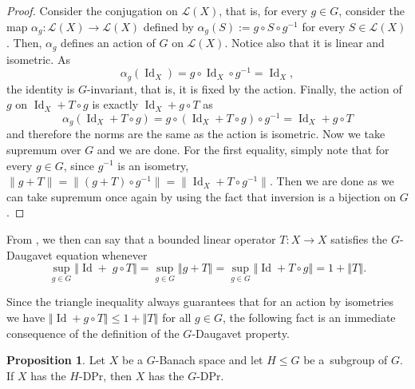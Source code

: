 \documentclass[a4paper,12pt]{amsart}
\theoremstyle{definition}
\newtheorem{proposition}[theorem]{Proposition}
\theoremstyle{definition}
\theoremstyle{remark}
\numberwithin{equation}{section}
\DeclareMathOperator{\id}{Id}
\renewcommand{\leq}{\leqslant}
\newcommand{\<}{\langle}
\renewcommand{\>}{\rangle}
\newcommand{\norm}[1]{\left\Vert#1\right\Vert}
\begin{document}
	\begin{proof} Consider the conjugation on $\mathcal{L}(X)$, that is, for every $g \in G$, consider the map $\alpha_g: \mathcal{L}(X) \rightarrow \mathcal{L}(X)$ defined by $\alpha_g(S) := g \circ S \circ g^{-1}$ for every $S \in \mathcal{L}(X)$. Then, $\alpha_g$ defines an action of $G$ on $\mathcal{L}(X)$. Notice also that it is linear and isometric. As
		\begin{equation*}
			\alpha_g(\id_X) = g \circ \id_X \circ g^{-1} = \id_X, 
		\end{equation*}
		the identity is $G$-invariant, that is, it is fixed by the action. Finally, the action of $g$ on $\id_X + T \circ g$ is exactly $\id_X + g \circ T$ as 
		\begin{equation*}
			\alpha_g(\id_X + T \circ g) = g \circ (\id_X + T \circ g) \circ g^{-1} = \id_X + g \circ T
		\end{equation*}
		and therefore the norms are the same as the action is isometric. Now we take supremum over $G$ and we are done. For the first equality, simply note that for every $g\in G$, since $g^{-1}$ is an isometry, $\|g+T\|=\|(g+T)\circ g^{-1}\|=\|\id_X+T\circ g^{-1}\|$. Then  we are done as we can take supremum once again by using the fact that inversion is a bijection on $G$.
	\end{proof}
	
	
	From , we then can say that a bounded linear operator $T:X\to X$ satisfies the $G$-Daugavet equation whenever
	\begin{equation} \label{G-Daugavet-equation}
		\sup_{g\in G}\norm{\id + \; g \circ T}= \sup_{g \in G} \norm{g + T}
		= \sup_{g \in G} \norm{\id + T \circ g} = 1+\norm{T} .
	\end{equation}
	
	
	Since the triangle inequality always guarantees that for an action by isometries we have $\norm{\id + g \circ T} \leq 1 + \norm{T}$ for all $g \in G$, the following fact is an immediate consequence of the definition of the $G$-Daugavet property.
	
	\begin{proposition} \label{fact-DP-implies-GDP}
		Let $X$ be a $G$-Banach space and let $H \leq G$ be a~subgroup of $G$. If $X$ has the $H$-DPr, then $X$ has the $G$-DPr. 
	\end{proposition}
	
\end{document}
